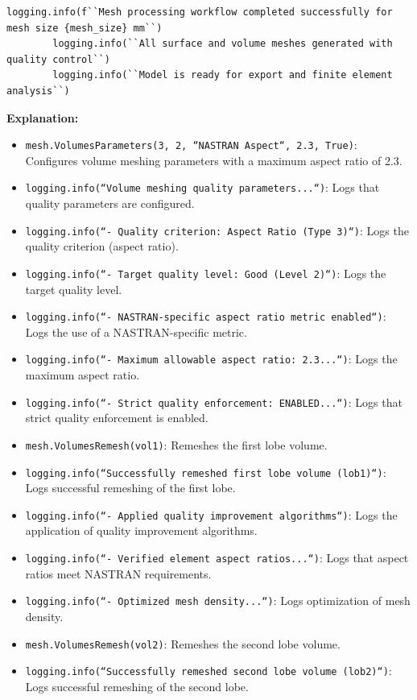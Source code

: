 \documentclass{book}
\begin{document}
\begin{itemize}[leftmargin=*,label=\textbullet]
\begin{lstlisting}[caption={MeshProcessor Class - Volume Meshing},label={lst:meshprocessor_5}]
        logging.info(f``Mesh processing workflow completed successfully for mesh size {mesh_size} mm``)
        logging.info(``All surface and volume meshes generated with quality control``)
        logging.info(``Model is ready for export and finite element analysis``)
\end{lstlisting}
\textbf{Explanation:}
\begin{itemize}
    \item \texttt{mesh.VolumesParameters(3, 2, ``NASTRAN Aspect``, 2.3, True)}: Configures volume meshing parameters with a maximum aspect ratio of 2.3.
    \item \texttt{logging.info(``Volume meshing quality parameters...``)}: Logs that quality parameters are configured.
    \item \texttt{logging.info(``- Quality criterion: Aspect Ratio (Type 3)``)}: Logs the quality criterion (aspect ratio).
    \item \texttt{logging.info(``- Target quality level: Good (Level 2)``)}: Logs the target quality level.
    \item \texttt{logging.info(``- NASTRAN-specific aspect ratio metric enabled``)}: Logs the use of a NASTRAN-specific metric.
    \item \texttt{logging.info(``- Maximum allowable aspect ratio: 2.3...``)}: Logs the maximum aspect ratio.
    \item \texttt{logging.info(``- Strict quality enforcement: ENABLED...``)}: Logs that strict quality enforcement is enabled.
    \item \texttt{mesh.VolumesRemesh(vol1)}: Remeshes the first lobe volume.
    \item \texttt{logging.info(``Successfully remeshed first lobe volume (lob1)``)}: Logs successful remeshing of the first lobe.
    \item \texttt{logging.info(``- Applied quality improvement algorithms``)}: Logs the application of quality improvement algorithms.
    \item \texttt{logging.info(``- Verified element aspect ratios...``)}: Logs that aspect ratios meet NASTRAN requirements.
    \item \texttt{logging.info(``- Optimized mesh density...``)}: Logs optimization of mesh density.
    \item \texttt{mesh.VolumesRemesh(vol2)}: Remeshes the second lobe volume.
    \item \texttt{logging.info(``Successfully remeshed second lobe volume (lob2)``)}: Logs successful remeshing of the second lobe.

\end{itemize}
\end{itemize}
\end{document}
